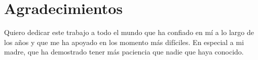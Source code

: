 \documentclass[12pt,twoside,titlepage]{report}
\newcommand{\nombreautor}{Oscar Nydza Nicpoñ}
\newcommand{\nombretutor}{Juan Manuel Serrano Hidalgo}
\newcommand{\titulotrabajo}{Comparativa entre las API de Spark en Scala y Python}
\newcommand{\escuelalargo}{Escuela Técnica Superior de Ingeniería Informática}
\newcommand{\universidad}{Universidad Rey Juan Carlos}
\newcommand{\fecha}{Fecha}
\newcommand\blankpage{%
    \newpage
    \null
    \thispagestyle{empty}%
    \newpage}
\begin{document}








\hypersetup{pageanchor=true}

\normalsize
\afterpage{\blankpage} %






\setlength{\parskip}{0.75em}
\renewcommand{\baselinestretch}{1.25}

\setcounter{page}{2}



\chapter*{Agradecimientos}

Quiero dedicar este trabajo a todo el mundo que ha confiado en mí a lo largo de los años y que me ha apoyado en los momento más difíciles. En especial a mi madre, que ha demostrado tener más paciencia que nadie que haya conocido.
\end{document}
